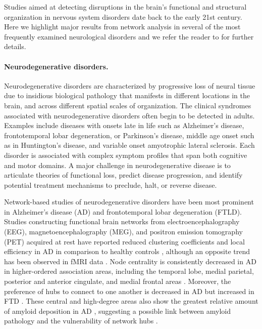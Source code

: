 \documentclass[12pt]{article}
\begin{document}
Studies aimed at detecting disruptions in the brain's functional and structural organization in nervous system disorders date back to the early 21st century. Here we highlight major results from network analysis in several of the most frequently examined neurological disorders and we refer the reader to \cite{Stam2014} for further details.

\paragraph{Neurodegenerative disorders.}

Neurodegenerative disorders are characterized by progressive loss of neural tissue due to insidious biological pathology that manifests in different locations in the brain, and across different spatial scales of organization. The clinical syndromes associated with neurodegenerative disorders often begin to be detected in adults. Examples include diseases with onsets late in life such as Alzheimer's disease, frontotemporal lobar degeneration, or Parkinson's disease, middle age onset such as in Huntington's disease, and variable onset amyotrophic lateral sclerosis. Each disorder is associated with complex symptom profiles that span both cognitive and motor domains. A major challenge in neurodegenerative disease is to articulate theories of functional loss, predict disease progression, and identify potential treatment mechanisms to preclude, halt, or reverse disease. 

Network-based studies of neurodegenerative disorders have been most prominent in Alzheimer's disease (AD) and frontotemporal lobar degeneration (FTLD). Studies constructing functional brain networks from electroencephalography (EEG), magnetoencephalography (MEG), and positron emission tomography (PET) acquired at rest have reported reduced clustering coefficients and local efficiency in AD in comparison to healthy controls \cite{dubbelink2014predicting,skidmore2011connectivity,agosta2013brain,heringa2014multiple,tijms2013single,reijmer2013disruption,de2009functional,stam2009graph,de2014effect,supekar2008network,brier2014functional,seo2013whole,lo2010diffusion}, although an opposite trend has been observed in fMRI data \cite{wang2013amnestic,he2008structural,yao2010abnormal,zhao2012disrupted,liu2012altered}. Node centrality is consistently decreased in AD in higher-ordered association areas, including the temporal lobe, medial parietal, posterior and anterior cingulate, and medial frontal areas \cite{dubbelink2013disrupted,agosta2013brain,de2012activity,lo2010diffusion,brier2014functional,seo2013whole,yao2010abnormal,minati2014widespread}. Moreover, the preference of hubs to connect to one another is decreased in  AD \cite{agosta2013brain,de2009functional} but increased in FTD \cite{agosta2013brain,de2009functional}. These central and high-degree areas also show the greatest relative amount of amyloid deposition in AD \cite{buckner2009cortical}, suggesting a possible link between amyloid pathology and the vulnerability of network hubs \cite{Stam2014}. 
\end{document}
